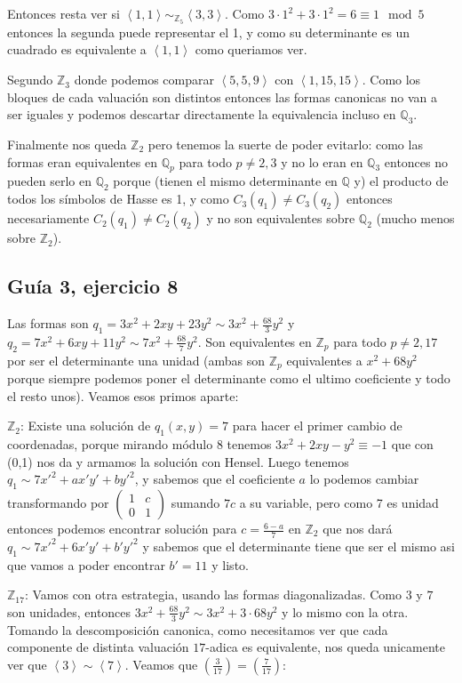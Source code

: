 \documentclass[12pt]{amsart}
\newcommand{\QQ}{\mathbb{Q}}
\newcommand{\ZZ}{\mathbb{Z}}
\newcommand{\leg}[2]{\left( \frac{#1}{#2} \right)}
\newcommand{\minimat}[4]{\left(\begin{smallmatrix} #1 & #2 \\ #3 & #4 
\end{smallmatrix}\right)}
\newcommand{\lc}{\left<}
\newcommand{\rc}{\right>}
\theoremstyle{plain}
\begin{document}
Entonces resta ver si $\lc 1,1\rc\sim_{\ZZ_5}\lc 3,3\rc$. 
Como $3\cdot 1^2+3\cdot 1^2=6\equiv 1 \mod 5$ entonces la 
segunda puede representar el 1, y como su determinante es
un cuadrado es equivalente a $\lc 1,1\rc$ como queriamos ver.

Segundo $\ZZ_3$ donde podemos comparar $\lc 5,5,9\rc$ con 
$\lc 1,15,15\rc$. Como los bloques de cada valuación son 
distintos entonces las formas canonicas no van a ser iguales
y podemos descartar directamente la equivalencia incluso en
$\QQ_3$.

Finalmente nos queda $\ZZ_2$ pero tenemos la suerte de poder
evitarlo: como las formas eran equivalentes en $\QQ_p$ para
todo $p\neq 2,3$ y no lo eran en $\QQ_3$ entonces no pueden 
serlo en $\QQ_2$ porque (tienen el mismo determinante en 
$\QQ$ y) el producto de todos los símbolos de Hasse es 1, y 
como $C_3(q_1)\neq C_3(q_2)$ entonces necesariamente 
$C_2(q_1)\neq C_2(q_2)$ y no son equivalentes sobre $\QQ_2$
(mucho menos sobre $\ZZ_2$). 


\subsection*{Guía 3, ejercicio 8} 
Las formas son $q_1=3x^2+2xy+23y^2\sim 3x^2+\frac{68}{3}y^2$ 
y $q_2=7x^2+6xy+11y^2\sim7x^2+\frac{68}{7}y^2$. Son 
equivalentes en $\ZZ_p$ para todo $p\neq2,17$ por ser el 
determinante una unidad (ambas son $\ZZ_p$ equivalentes 
a $x^2+68y^2$ porque siempre podemos poner el determinante
como el ultimo coeficiente y todo el resto unos). Veamos 
esos primos aparte:

$\ZZ_2$: Existe una solución de $q_1(x,y)=7$ para hacer 
el primer cambio de coordenadas, porque mirando módulo 8 
tenemos $3x^2+2xy-y^2 \equiv -1$ que con (0,1) nos da y 
armamos la solución con Hensel. Luego
tenemos $q_1 \sim 7x'^2 + ax'y' + by'^2$, y sabemos que el 
coeficiente $a$ lo podemos cambiar transformando por 
$\minimat{1}{c}{0}{1}$ sumando $7c$ a su variable, pero como 7 
es unidad entonces podemos encontrar solución para $c = 
\frac{6-a}{7}$ en $\ZZ_2$ que nos dará $q_1\sim 7x'^2 + 6x'y' + 
b'y'^2$ y sabemos que el determinante tiene que ser el mismo asi 
que vamos a poder encontrar $b'= 11$ y listo.

$\ZZ_{17}$: Vamos con otra estrategia, usando las formas 
diagonalizadas. Como $3$ y $7$ son unidades, entonces 
$3x^2+\frac{68}{3}y^2\sim 3x^2+3\cdot68y^2$ y lo mismo con
la otra. Tomando la descomposición canonica, como
necesitamos ver que cada componente de distinta valuación 
$17$-adica es equivalente, nos queda unicamente ver que 
$\lc3\rc \sim\lc7\rc$. Veamos que $\leg{3}{17}=\leg{7}{17}$:
\end{document}
